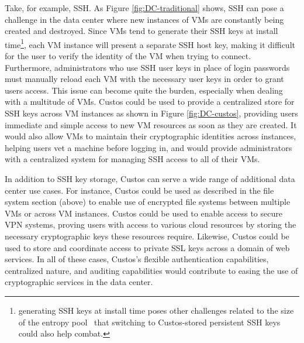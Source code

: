 Take, for example, SSH. As Figure \ref{fig:DC-traditional} shows, SSH
can pose a challenge in the data center where new instances of VMs are
constantly being created and destroyed. Since VMs tend to generate
their SSH keys at install time\footnote{generating SSH keys at install
  time poses other challenges related to the size of the entropy
  pool~\cite{Heninger2012} that switching to Custos-stored persistent
  SSH keys could also help combat.}, each VM instance will present a
separate SSH host key, making it difficult for the user to verify the
identity of the VM when trying to connect. Furthermore, administrators
who use SSH user keys in place of login passwords must manually reload
each VM with the necessary user keys in order to grant users
access. This issue can become quite the burden, especially when
dealing with a multitude of VMs. Custos could be used to provide a
centralized store for SSH keys across VM instances as shown in Figure
\ref{fig:DC-custos}, providing users immediate and simple access to
new VM resources as soon as they are created. It would also allow VMs
to maintain their cryptographic identities across instances, helping
users vet a machine before logging in, and would provide
administrators with a centralized system for managing SSH access to
all of their VMs.

In addition to SSH key storage, Custos can serve a wide range of
additional data center use cases. For instance, Custos could be used
as described in the file system section (above) to enable use of
encrypted file systems between multiple VMs or across VM
instances. Custos could be used to enable access to secure VPN
systems, proving users with access to various cloud resources by
storing the necessary cryptographic keys these resources
require. Likewise, Custos could be used to store and coordinate access
to private SSL keys across a domain of web services. In all of these
cases, Custos's flexible authentication capabilities, centralized
nature, and auditing capabilities would contribute to easing the use
of cryptographic services in the data center.


